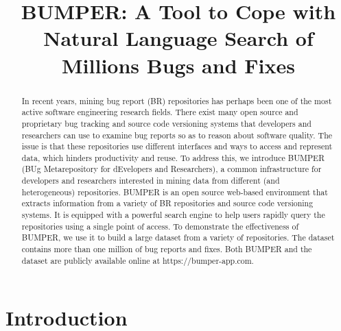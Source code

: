 \documentclass[conference]{IEEEtran}
\begin{document}
\title{BUMPER: A Tool to Cope with Natural Language Search of Millions Bugs and Fixes}


\author{
\and
{}
}

\maketitle

\begin{abstract}
  In recent years, mining bug report (BR) repositories has perhaps been one of the most active software engineering research fields. There exist many open source and proprietary bug tracking and source code versioning systems that developers and researchers can use to examine bug reports so as to reason about software quality. The issue is that these repositories use different interfaces and ways to access and represent data, which hinders productivity and reuse. To address this, we introduce BUMPER (BUg Metarepository for dEvelopers and Researchers), a common infrastructure for developers and researchers interested in mining data from different (and heterogeneous) repositories. BUMPER is an open source web-based environment that extracts information from a variety of BR repositories and source code versioning systems. It is equipped with a powerful search engine to help users rapidly query the repositories using a single point of access. To demonstrate the effectiveness of BUMPER, we use it to build a large dataset from a variety of repositories. The dataset contains more than one million of bug reports and fixes. Both BUMPER and the dataset are publicly available online at https://bumper-app.com.

\end{abstract}


\IEEEpeerreviewmaketitle


\section{Introduction}
\end{document}
